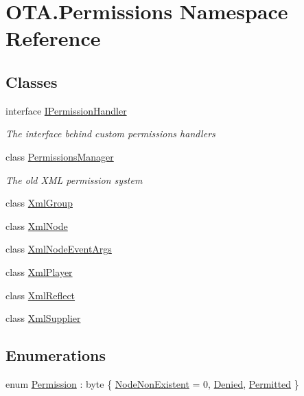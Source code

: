 \hypertarget{namespaceOTA_1_1Permissions}{}\section{O\+T\+A.\+Permissions Namespace Reference}
\label{namespaceOTA_1_1Permissions}
\subsection*{Classes}
\begin{DoxyCompactItemize}
\item 
interface \hyperlink{interfaceOTA_1_1Permissions_1_1IPermissionHandler}{I\+Permission\+Handler}
\begin{DoxyCompactList}\small\item\em The interface behind custom permissions handlers \end{DoxyCompactList}\item 
class \hyperlink{classOTA_1_1Permissions_1_1PermissionsManager}{Permissions\+Manager}
\begin{DoxyCompactList}\small\item\em The old X\+M\+L permission system \end{DoxyCompactList}\item 
class \hyperlink{classOTA_1_1Permissions_1_1XmlGroup}{Xml\+Group}
\item 
class \hyperlink{classOTA_1_1Permissions_1_1XmlNode}{Xml\+Node}
\item 
class \hyperlink{classOTA_1_1Permissions_1_1XmlNodeEventArgs}{Xml\+Node\+Event\+Args}
\item 
class \hyperlink{classOTA_1_1Permissions_1_1XmlPlayer}{Xml\+Player}
\item 
class \hyperlink{classOTA_1_1Permissions_1_1XmlReflect}{Xml\+Reflect}
\item 
class \hyperlink{classOTA_1_1Permissions_1_1XmlSupplier}{Xml\+Supplier}
\end{DoxyCompactItemize}
\subsection*{Enumerations}
\begin{DoxyCompactItemize}
\item 
enum \hyperlink{namespaceOTA_1_1Permissions_a5335d23d62bc219ccbf40b018c002e8d}{Permission} \+: byte \{ \hyperlink{namespaceOTA_1_1Permissions_a5335d23d62bc219ccbf40b018c002e8daddc60370394507c38d92136a6dff6369}{Node\+Non\+Existent} = 0, 
\hyperlink{namespaceOTA_1_1Permissions_a5335d23d62bc219ccbf40b018c002e8da58d036b9b7f0e7eb38cfb90f1cc70a73}{Denied}, 
\hyperlink{namespaceOTA_1_1Permissions_a5335d23d62bc219ccbf40b018c002e8dad383a04a7397ca336d985e7e55d78ad5}{Permitted}
 \}
\end{DoxyCompactItemize}


